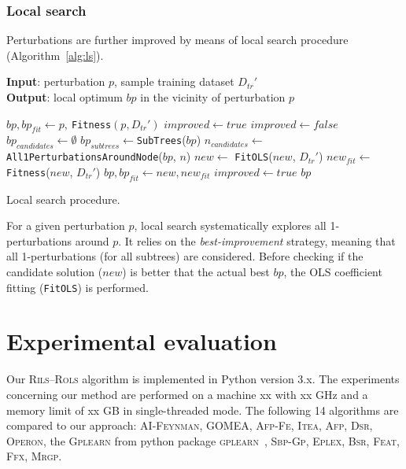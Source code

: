 \documentclass[a4paper,12pt]{elsarticle}
\begin{document}
\subsubsection{Local search}\label{sec:ls}

Perturbations are further improved by means of local search procedure (Algorithm~\ref{alg:ls}). 

\begin{algorithm}
	\hspace*{\algorithmicindent} \textbf{Input}: perturbation $p$, sample training dataset $D_{tr}'$ \\
	\hspace*{\algorithmicindent} \textbf{Output}: local optimum $bp$ in the vicinity of perturbation $p$
	\begin{algorithmic}[1] 
		\State $bp, bp_{fit} \gets p,\ $\texttt{Fitness}$(p,D_{tr}')$ 
		\State $improved \gets true$
			\State $improved \gets false$
			\State $bp_{candidates} \gets \emptyset$
			\State $bp_{subtrees} \gets $\texttt{SubTrees}($bp$)
				\State $n_{candidates} \gets $ \texttt{All1PerturbationsAroundNode}($bp$, $n$)
					\State $new \gets$ \texttt{FitOLS}($new$, $D_{tr}'$)
					\State $new_{fit} \gets$ \texttt{Fitness}($new$, $D_{tr}'$)
						\State $bp, bp_{fit} \gets new, new_{fit}$
						\State $improved \gets true$
					\EndIf
				\EndFor
			\EndFor
		\EndWhile
		\State \Return $bp$
		\EndProcedure
	\end{algorithmic}
	\caption{Local search procedure.}
	\label{alg:ls}
\end{algorithm}  

For a given perturbation $p$, local search systematically explores all 1-perturbations around $p$. It relies on the \emph{best-improvement} strategy, meaning that all 1-perturbations (for all subtrees) are considered. Before checking if the candidate solution ($new$) is better that the actual best $bp$, the OLS coefficient fitting (\texttt{FitOLS}) is performed. 
   
\section{Experimental evaluation}\label{sec:experiments}

Our \textsc{Rils}--\textsc{Rols} algorithm is implemented in Python version 3.x. The experiments concerning our method are performed on a machine xx with xx GHz and a memory limit of xx GB in single-threaded mode.  
 The following 14 algorithms are compared to our approach: \textsc{AI-Feynman}, \textsc{GOMEA}, \textsc{Afp-Fe}, \textsc{Itea}, \textsc{Afp}, \textsc{Dsr}, \textsc{Operon}, the \textsc{Gplearn} from python package \textsc{gplearn}~\cite{stephens2016genetic}, \textsc{Sbp-Gp}, \textsc{Eplex}, \textsc{Bsr}, \textsc{Feat}, \textsc{Ffx}, \textsc{Mrgp}. 
\end{document}
